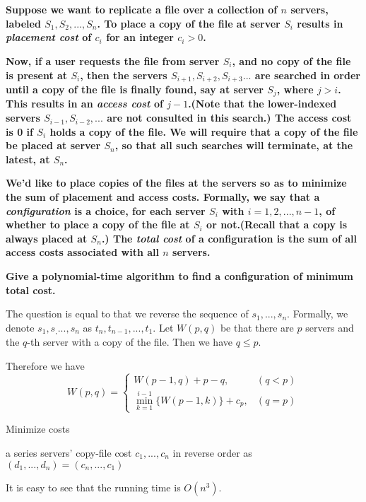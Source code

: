 
\chapter{}
\textbf{
Suppose we want to replicate a file over a collection of $n$ servers, labeled $S_1,S_2,...,S_n$. To place a copy of the file at server $S_i$ results in \emph{placement cost} of $c_i$ for an integer $c_i>0$.
}

\textbf{
Now, if a user requests the file from server $S_i$, and no copy of the file is present at $S_i$, then the servers $S_{i+1},S_{i+2},S_{i+3}...$ are searched in order until a copy of the file is finally found, say at server $S_j$, where $j>i$. This results in an \emph{access cost} of $j-1$.(Note that the lower-indexed servers $S_{i-1},S_{i-2},...$ are not consulted in this search.) The access cost is 0 if $S_i$ holds a copy of the file. We will require that a copy of the file be placed at server $S_n$, so that all such searches will terminate, at the latest, at $S_n$.
}

\textbf{
We'd like to place copies of the files at the servers so as to minimize the sum of placement and access costs. Formally, we say that a \emph{configuration} is a choice, for each server $S_i$ with $i=1,2,...,n-1$, of whether to place a copy of the file at $S_i$ or not.(Recall that a copy is always placed at $S_n$.) The \emph{total cost} of a configuration is the sum of all access costs associated with all $n$ servers.
}

\textbf{
Give a polynomial-time algorithm to find a configuration of minimum total cost.
}

The question is equal to that we reverse the sequence of $s_1,...,s_n$. Formally, we denote $s_1,s_,...,s_n$ as $t_n, t_{n-1},...,t_1$. Let $W(p,q)$ be that there are $p$ servers and the $q$-th server with a copy of the file. Then we have $q\leq p$.

Therefore we have
\begin{equation}
W(p,q)=
\left\{
             \begin{array}{lr}
             W(p-1,q)+p-q,
             & (q<p) \\
             \min_{k=1}^{i-1}\{W(p-1,k)\}+c_p,
             & (q=p)
             \end{array}
\right.
\end{equation}



\begin{algorithm}
\caption{Minimize costs}
\label{alg_2}
\begin{algorithmic}[1]
\REQUIRE a series servers' copy-file cost $c_1,...,c_n$ in reverse order as $(d_1,...,d_n)=(c_n,...,c_1)$
        \ELSE
        \ENDIF
    \ENDFOR
\ENDFOR


\end{algorithmic}
\end{algorithm}

It is easy to see that the running time is $O(n^3)$.